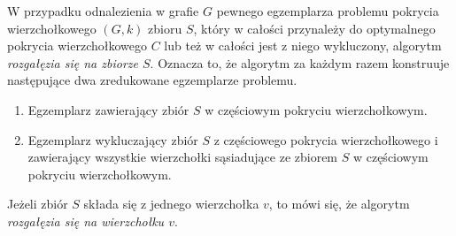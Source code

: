{\begin{bproof}
  \end{bproof}
  \begin{definition}
    W przypadku odnalezienia w grafie $G$ pewnego egzemplarza problemu pokrycia wierzchołkowego $(G, k)$ zbioru $S$, który w całości przynależy do optymalnego pokrycia wierzchołkowego $C$ lub też w całości jest z niego wykluczony, algorytm \emph{rozgałęzia się na zbiorze $S$}.
    Oznacza to, że algorytm za każdym razem konstruuje następujące dwa zredukowane egzemplarze problemu.
    \begin{enumerate}
      \item Egzemplarz zawierający zbiór $S$ w częściowym pokryciu wierzchołkowym.
      \item Egzemplarz wykluczający zbiór $S$ z częściowego pokrycia wierzchołkowego i zawierający wszystkie wierzchołki sąsiadujące ze zbiorem $S$ w częściowym pokryciu wierzchołkowym.
    \end{enumerate}
    Jeżeli zbiór $S$ składa się z jednego wierzchołka $v$, to mówi się, że algorytm \emph{rozgałęzia się na wierzchołku $v$}.
  \end{definition}
}
